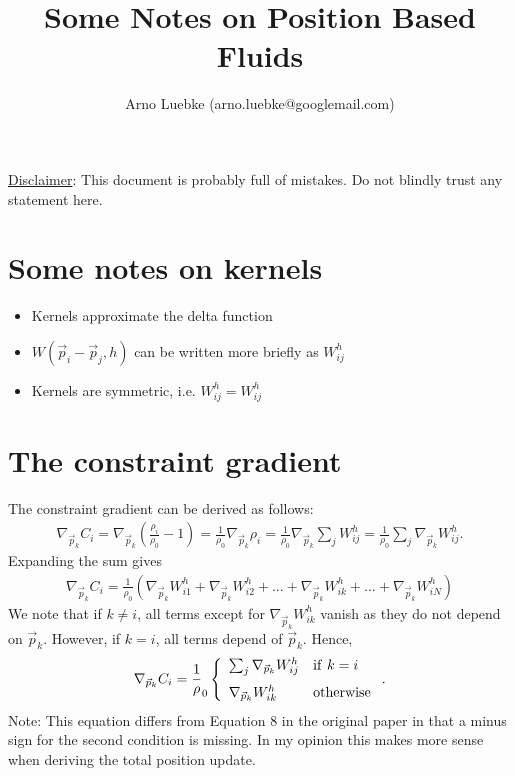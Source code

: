 \documentclass[8pt]{article}
\title{\sf Some Notes on Position Based Fluids}
\author{\small Arno Luebke (arno.luebke@googlemail.com)}
\date{}
\begin{document}
\maketitle
\underline{Disclaimer}: This document is probably full of mistakes. Do not blindly trust any statement here.

\section*{\sf Some notes on kernels}
\begin{itemize}
  \item Kernels approximate the delta function
  \item $W(\vec{p}_i - \vec{p}_j, h)$ can be written more briefly as $W^h_{ij}$
  \item Kernels are symmetric, i.e. $W^h_{ij} = W^h_{ij}$
\end{itemize}

\section*{\sf The constraint gradient}
The constraint gradient can be derived as follows:
\begin{eqnarray}
\nabla_{\vec{p}_k}C_i = \nabla_{\vec{p}_k}\left(\frac{\rho_i}{\rho_0} - 1\right)=\frac{1}{\rho_0} \nabla_{\vec{p}_k}\rho_i =\frac{1}{\rho_0} \nabla_{\vec{p}_k}\sum_jW^h_{ij}=\frac{1}{\rho_0} \sum_j\nabla_{\vec{p}_k}W^h_{ij}.
\end{eqnarray}
Expanding the sum gives
\begin{eqnarray}
\nabla_{\vec{p}_k}C_i = \frac{1}{\rho_0}\left(\nabla_{\vec{p}_k}W^h_{i1} + \nabla_{\vec{p}_k}W^h_{i2} + ... + \nabla_{\vec{p}_k}W^h_{ik} + ... + \nabla_{\vec{p}_k}W^h_{iN}\right)
\end{eqnarray}
We note that if $k\neq i$, all terms except for $\nabla_{\vec{p}_k}W^h_{ik}$ vanish as they do not depend on $\vec{p}_k$. However, if $k = i$, all terms depend of $\vec{p}_k$. Hence,
\begin{eqnarray}
\nabla_{\vec{p}_k}C_i =\frac{1}{\rho}_0 \left\{\begin{array}{ll}
\sum_j \nabla_{\vec{p}_k}W^h_{ij}& {\rm if \ } k = i \\[0.25cm]
\nabla_{\vec{p}_k}W^h_{ik} & {\rm otherwise}
\end{array}\right. .
\end{eqnarray}
Note: This equation differs from Equation 8 in the original paper in that a minus sign for the second condition is missing. In my opinion this makes more sense when deriving the total position update.
\end{document}
